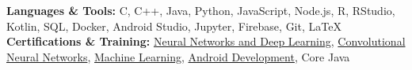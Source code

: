 \documentclass[11pt]{article}
\begin{document}
    	\textbf{Languages \& Tools:} C, C++, Java, Python, JavaScript, Node.js, R, RStudio, Kotlin, SQL, Docker, Android Studio, Jupyter, Firebase, Git, \LaTeX\\
        \textbf{Certifications \& Training:} \href{https://drive.google.com/file/d/1mir_TBy9GinXpSU3H-8LyYn68GkcM62f/view?usp=sharing}{Neural Networks and Deep Learning}, \href{https://drive.google.com/file/d/18cQMPfNLtvY4-Ozh7hZnUIDKYh9tRYPG/view?usp=sharing}{Convolutional Neural Networks}, \href{https://drive.google.com/file/d/13L4JKQ1pwLG9YVevPVZLNRLUeZWGkvyU/view?usp=sharing}{Machine Learning}, \href{https://drive.google.com/file/d/1Hp5dvhNVz9FvjQ6Y4vIVZldKpb8m8LCp/view?usp=sharing}{Android Development}, Core Java\\
   
\end{document}
